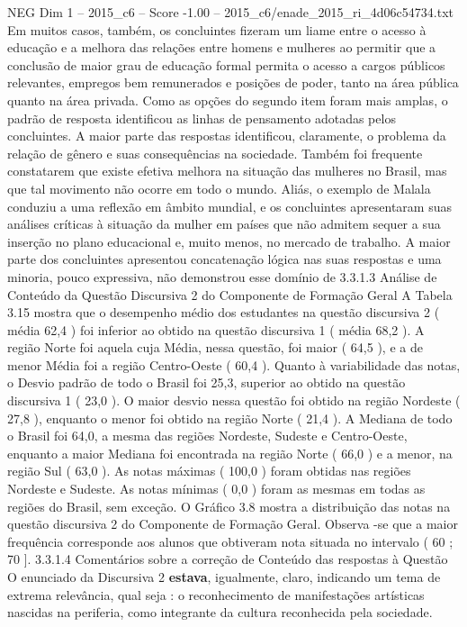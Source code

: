 \begin{textsample}{NEG Dim 1 – 2015\_c6 – Score -1.00 – 2015\_c6/enade\_2015\_ri\_4d06c54734.txt}
Em muitos casos, também, os concluintes fizeram um liame entre o acesso à educação e a melhora das relações entre homens e mulheres ao permitir que a conclusão de maior grau de educação formal permita o acesso a cargos públicos relevantes, empregos bem remunerados e posições de poder, tanto na área pública quanto na área privada.
Como as opções do segundo item foram mais amplas, o padrão de resposta identificou as linhas de pensamento adotadas pelos concluintes.
A maior parte das respostas identificou, claramente, o problema da relação de gênero e suas consequências na sociedade.
Também foi frequente constatarem que existe efetiva melhora na situação das mulheres no Brasil, mas que tal movimento não ocorre em todo o mundo.
Aliás, o exemplo de Malala conduziu a uma reflexão em âmbito mundial, e os concluintes apresentaram suas análises críticas à situação da mulher em países que não admitem sequer a sua inserção no plano educacional e, muito menos, no mercado de trabalho.
A maior parte dos concluintes apresentou concatenação lógica nas suas respostas e uma minoria, pouco expressiva, não demonstrou esse domínio de 3.3.1.3 Análise de Conteúdo da Questão Discursiva 2 do Componente de Formação Geral A Tabela 3.15 mostra que o desempenho médio dos estudantes na questão discursiva 2 ( média 62,4 ) foi inferior ao obtido na questão discursiva 1 ( média 68,2 ).
A região Norte foi aquela cuja Média, nessa questão, foi maior ( 64,5 ), e a de menor Média foi a região Centro-Oeste ( 60,4 ).
Quanto à variabilidade das notas, o Desvio padrão de todo o Brasil foi 25,3, superior ao obtido na questão discursiva 1 ( 23,0 ).
O maior desvio nessa questão foi obtido na região Nordeste ( 27,8 ), enquanto o menor foi obtido na região Norte ( 21,4 ).
A Mediana de todo o Brasil foi 64,0, a mesma das regiões Nordeste, Sudeste e Centro-Oeste, enquanto a maior Mediana foi encontrada na região Norte ( 66,0 ) e a menor, na região Sul ( 63,0 ).
As notas máximas ( 100,0 ) foram obtidas nas regiões Nordeste e Sudeste.
As notas mínimas ( 0,0 ) foram as mesmas em todas as regiões do Brasil, sem exceção.
O Gráfico 3.8 mostra a distribuição das notas na questão discursiva 2 do Componente de Formação Geral.
Observa -se que a maior frequência corresponde aos alunos que obtiveram nota situada no intervalo ( 60 ; 70 ]. 3.3.1.4 Comentários sobre a correção de Conteúdo das respostas à Questão O enunciado da Discursiva 2 \textbf{estava}, igualmente, claro, indicando um tema de extrema relevância, qual seja : o reconhecimento de manifestações artísticas nascidas na periferia, como integrante da cultura reconhecida pela sociedade.

\end{textsample}
